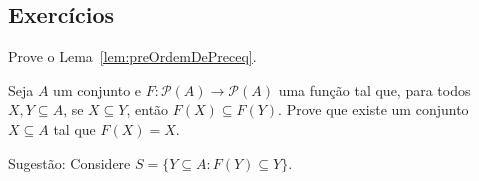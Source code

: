 \subsection*{Exercícios}
\begin{exercise}\label{exr:preOrdemDePreceq}
    Prove o Lema~\ref{lem:preOrdemDePreceq}.
\end{exercise}

\begin{exercise}[$Z^-$]
Seja $A$ um conjunto e $F:\mathcal P(A)\to \mathcal{P}(A)$ uma função tal que, para todos $X, Y\subseteq A$, se $X\subseteq Y$, então $F(X)\subseteq F(Y)$.
Prove que existe um conjunto $X\subseteq A$ tal que $F(X)=X$.

Sugestão: Considere $S=\{Y\subseteq A : F(Y)\subseteq Y\}$.
\end{exercise}

